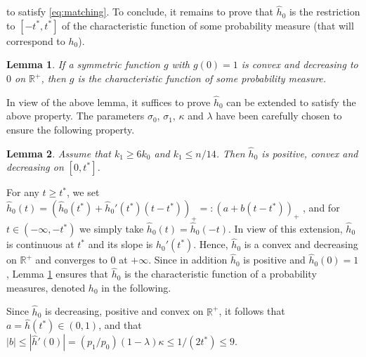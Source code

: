 \documentclass[twoside,11pt]{article}
\newtheorem{lem}{Lemma}
\newcommand{\<}{\langle}
\renewcommand{\>}{\rangle}
\begin{document}
to satisfy \eqref{eq:matching}. To conclude, it remains to prove that  $\widehat{h}_0$ is the restriction to $[-t^*,t^*]$ of the characteristic function of some probability measure (that will correspond to $h_0$).
\begin{lem}\label{lem:convexity}
If a symmetric function $g$ with $g(0)=1$ is convex and decreasing to $0$ on $\mathbb{R}^+$, then $g$ is the characteristic function of some probability measure. 
\end{lem}
In view of the above lemma, it suffices to prove $\widehat{h}_0$ can be extended to satisfy the above property.  The parameters $\sigma_0$, $\sigma_1$, $\kappa$ and $\lambda$ have been carefully chosen to ensure the following property. 




\begin{lem}\label{lem:hatf0}
Assume that $k_1 \geq 6k_0$ and $k_1 \leq n/14$. Then $\widehat{h}_0$ is positive, convex and decreasing on $[0,t^*]$.
\end{lem}
For any $t \geq t^*$, we set $\widehat{h}_0(t) = ( \widehat{h}_0(t^*) + \widehat{h}_0'(t^*) (t-t^*) )_+ =: (a + b(t-t^*))_+$ ,
and for $t\in (-\infty,-t^*)$ we simply take $\widehat{h}_0(t)= \widehat{h}_0(-t)$. In view of this extension, $\widehat{h}_0$ is continuous at $t^*$ and its  slope is $\widehat{h}_0'(t^*)$. Hence,  $\widehat{h}_0$ is a convex and decreasing  on $\mathbb R^+$ and converges to 0 at $+\infty$. Since in addition $\widehat{h}_0$ is positive and $\widehat{h}_0(0)=1$, Lemma \ref{lem:convexity} ensures that $\widehat{h}_0$ is the characteristic function of a probability measures, denoted $h_0$ in the following. 

 
Since $\widehat{h}_0$ is decreasing, positive and convex on $\mathbb{R}^+$, it follows that $a= \widehat{h}(t^*)\in (0,1)$, and that $|b| \leq |\widehat{h}'(0)| = (p_1/p_0) (1 - \lambda) \kappa \leq 1/(2t^*) \leq 9$.
\end{document}
